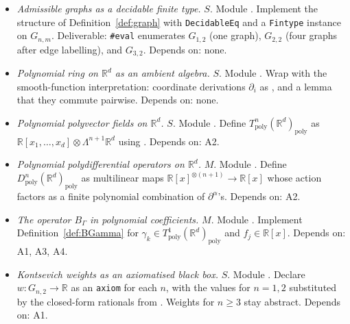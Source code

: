 \documentclass[11pt,a4paper]{article}
\theoremstyle{definition}
\newcommand{\R}{\mathbb{R}}
\newcommand{\Tpoly}{T_{\mathrm{poly}}}
\newcommand{\Dpoly}{D_{\mathrm{poly}}}
\newcommand{\defi}[1]{\emph{#1}}
\begin{document}
\begin{itemize}[leftmargin=2em]
  \item[\textbf{A1}]
    \defi{Admissible graphs as a decidable finite type.} $S$.
    Module . Implement
    the structure of Definition~\ref{def:graph} with
    \texttt{DecidableEq} and a \texttt{Fintype} instance on
    $G_{n,m}$. Deliverable: \texttt{\#eval} enumerates $G_{1,2}$
    (one graph), $G_{2,2}$ (four graphs after edge labelling), and
    $G_{3,2}$. Depends on: none.
  \item[\textbf{A2}]
    \defi{Polynomial ring on $\R^{d}$ as an ambient algebra.} $S$.
    Module . Wrap
     with the smooth-function
    interpretation: coordinate derivations
    $\partial_{i}$ as , and a lemma
    that they commute pairwise. Depends on: none.
  \item[\textbf{A3}]
    \defi{Polynomial polyvector fields on $\R^{d}$.} $S$.
    Module . Define
    $\Tpoly^{n}(\R^{d})_{\mathrm{poly}}$ as
    $\R[x_{1},\dots,x_{d}] \otimes \Lambda^{n+1} \R^{d}$ using
    . Depends on: A2.
  \item[\textbf{A4}]
    \defi{Polynomial polydifferential operators on $\R^{d}$.} $M$.
    Module . Define
    $\Dpoly^{n}(\R^{d})_{\mathrm{poly}}$ as multilinear maps
    $\R[x]^{\otimes(n+1)} \to \R[x]$ whose action factors as a
    finite polynomial combination of $\partial^{\alpha}$'s. Depends
    on: A2.
  \item[\textbf{A5}]
    \defi{The operator $B_{\Gamma}$ in polynomial coefficients.}
    $M$. Module . Implement
    Definition~\ref{def:BGamma} for
    $\gamma_{k} \in \Tpoly^{1}(\R^{d})_{\mathrm{poly}}$ and
    $f_{j} \in \R[x]$. Depends on: A1, A3, A4.
  \item[\textbf{A6}]
    \defi{Kontsevich weights as an axiomatised black box.} $S$.
    Module . Declare
    $w \colon G_{n,2} \to \R$ as an \texttt{axiom} for each $n$, with
    the values for $n = 1, 2$ substituted by the closed-form rationals
    from \cite[\S8.3]{Kontsevich2003}. Weights for $n \ge 3$ stay
    abstract. Depends on: A1.
\end{itemize}
\end{document}
